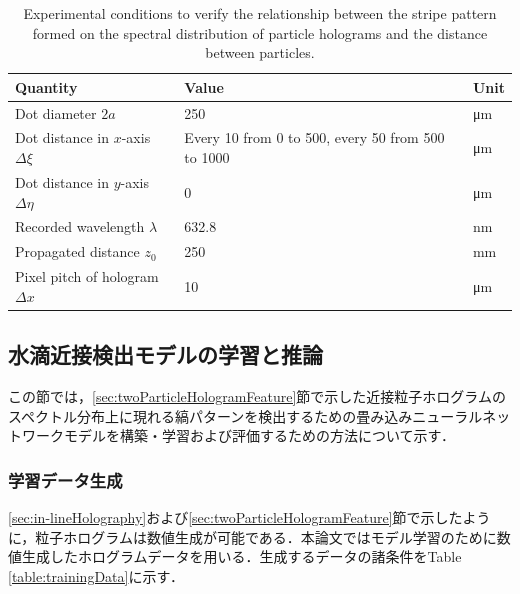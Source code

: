\begin{table}[H]
    \centering
    \caption{Experimental conditions to verify the relationship between the stripe pattern formed on the spectral distribution of particle holograms and the distance between particles.}
    \label{table:stripePatternExperiment}
    \begin{tabular}{lll}
    Quantity                               & Value                                             & Unit     \\ \hline \hline
    Dot diameter $2a$                      & 250                                               & \si{\um} \\ \hline
    Dot distance in $x$-axis $\Delta \xi$  & Every 10 from 0 to 500, every 50 from 500 to 1000 & \si{\um} \\ \hline
    Dot distance in $y$-axis $\Delta \eta$ & 0                                                 & \si{\um} \\ \hline 
    Recorded wavelength $\lambda$          & 632.8                                             & \si{\nm} \\ \hline
    Propagated distance $z_0$              & 250                                               & \si{\mm} \\ \hline
    Pixel pitch of hologram $\Delta x$     & 10                                                & \si{\um}
    \end{tabular}
\end{table}


\subsection{水滴近接検出モデルの学習と推論}\label{sec:EffNetV2}
この節では，\ref{sec:twoParticleHologramFeature}節で示した近接粒子ホログラムのスペクトル分布上に現れる縞パターンを検出するための畳み込みニューラルネットワークモデルを構築・学習および評価するための方法について示す．

\subsubsection{学習データ生成}
\ref{sec:in-lineHolography}および\ref{sec:twoParticleHologramFeature}節で示したように，粒子ホログラムは数値生成が可能である．本論文ではモデル学習のために数値生成したホログラムデータを用いる．生成するデータの諸条件をTable \ref{table:trainingData}に示す．

